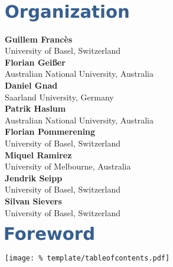 \documentclass[letterpaper]{article}
\begin{document}

\cleardoublepage

\vspace*{5mm}
\includegraphics[trim={15pt 0pt 0pt 0pt}]{template/organization.pdf}






\vspace*{14mm}
\noindent
\textbf{Guillem Franc\`es}\\
University of Basel, Switzerland\\[1em]
\textbf{Florian Gei{\ss}er}\\
Australian National University, Australia\\[1em]
\textbf{Daniel Gnad}\\
Saarland University, Germany\\[1em]
\textbf{Patrik Haslum}\\
Australian National University, Australia\\[1em]
\textbf{Florian Pommerening}\\
University of Basel, Switzerland\\[1em]
\textbf{Miquel Ramirez}\\
University of Melbourne, Australia\\[1em]
\textbf{Jendrik Seipp}\\
University of Basel, Switzerland\\[1em]
\textbf{Silvan Sievers}\\
University of Basel, Switzerland

\clearpage

\vspace*{5mm}
\includegraphics[trim={15pt 0pt 0pt 0pt}]{template/preface.pdf}


\clearpage

\vspace*{5mm}
\texttt{[image: \%
 template/tableofcontents.pdf]}

\renewcommand\contentsname{}
\tableofcontents

\cleardoublepage
{}

\end{document}
